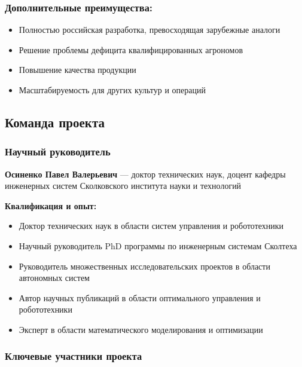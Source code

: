 \documentclass[12pt,a4paper]{article}
\begin{document}
\subsubsection{Дополнительные преимущества:}
\begin{itemize}
    \item Полностью российская разработка, превосходящая зарубежные аналоги
    \item Решение проблемы дефицита квалифицированных агрономов
    \item Повышение качества продукции
    \item Масштабируемость для других культур и операций
\end{itemize}

\subsection{Команда проекта}

\subsubsection{Научный руководитель}
\textbf{Осиненко Павел Валерьевич} — доктор технических наук, доцент кафедры инженерных систем Сколковского института науки и технологий

\textbf{Квалификация и опыт:}
\begin{itemize}
    \item Доктор технических наук в области систем управления и робототехники
    \item Научный руководитель PhD программы по инженерным системам Сколтеха
    \item Руководитель множественных исследовательских проектов в области автономных систем
    \item Автор научных публикаций в области оптимального управления и робототехники
    \item Эксперт в области математического моделирования и оптимизации
\end{itemize}

\subsubsection{Ключевые участники проекта}
\end{document}
